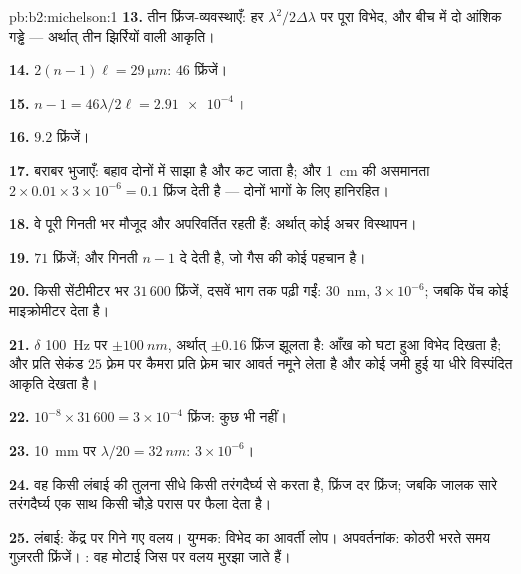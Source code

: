 \begin{solution}{pb:b2:michelson:1}
\textbf{13.} तीन फ्रिंज-व्यवस्थाएँ: हर $\lambda^2/2\Delta\lambda$ पर पूरा विभेद, और
बीच में दो आंशिक गड्ढे --- अर्थात् तीन झिर्रियों वाली आकृति।

\textbf{14.} $2(n - 1)\ell = \qty{29}{\micro m}$: $46$ फ्रिंजें।

\textbf{15.} $n - 1 = 46\lambda/2\ell = \qty{2.91e-4}{}$।

\textbf{16.} $9.2$ फ्रिंजें।

\textbf{17.} बराबर भुजाएँ: बहाव दोनों में साझा है और कट जाता है; और
\qty{1}{cm} की असमानता $2 \times 0.01 \times 3 \times 10^{-6} = 0.1$ फ्रिंज देती है ---
दोनों भागों के लिए हानिरहित।

\textbf{18.} वे पूरी गिनती भर मौजूद और अपरिवर्तित रहती हैं: अर्थात् कोई
अचर विस्थापन।

\textbf{19.} $71$ फ्रिंजें; और गिनती $n - 1$ दे देती है, जो गैस की कोई पहचान है।

\textbf{20.} किसी सेंटीमीटर भर $31\,600$ फ्रिंजें, दसवें भाग तक पढ़ी गईं:
\qty{30}{nm}, $3 \times 10^{-6}$; जबकि पेंच कोई माइक्रोमीटर देता है।

\textbf{21.} $\delta$ \qty{100}{Hz} पर $\pm\qty{100}{nm}$, अर्थात् $\pm0.16$ फ्रिंज झूलता है:
आँख को घटा हुआ विभेद दिखता है; और प्रति सेकंड $25$ फ़्रेम पर कैमरा
प्रति फ़्रेम चार आवर्त नमूने लेता है और कोई जमी हुई या धीरे विस्पंदित
आकृति देखता है।

\textbf{22.} $10^{-8} \times 31\,600 = 3 \times 10^{-4}$ फ्रिंज: कुछ भी नहीं।

\textbf{23.} \qty{10}{mm} पर $\lambda/20 = \qty{32}{nm}$: $3 \times 10^{-6}$।

\textbf{24.} वह किसी लंबाई की तुलना सीधे किसी तरंगदैर्घ्य से करता है, फ्रिंज
दर फ्रिंज; जबकि जालक सारे तरंगदैर्घ्य एक साथ किसी चौड़े परास पर फैला देता है।

\textbf{25.} लंबाई: केंद्र पर गिने गए वलय। युग्मक: विभेद का
आवर्ती लोप। अपवर्तनांक: कोठरी भरते समय गुज़रती फ्रिंजें।
: वह मोटाई जिस पर वलय मुरझा जाते हैं।
\end{solution}
